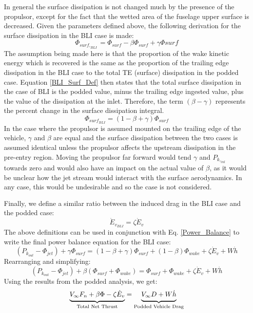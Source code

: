					In general the surface dissipation is not changed much by the presence of the propulsor, except for the fact that the wetted area of the fuselage upper surface is decreased.  Given the parameters defined above, the following derivation for the surface dissipation in the BLI case is made:
					\begin{equation}
						\Phi_{surf,_{BLI}} = \Phi_{surf} - \beta \Phi_{surf} + \gamma \Phi{surf}
						\label{BLI_Surf_Def}
					\end{equation}
					The assumption being made here is that the proportion of the wake kinetic energy which is recovered is the same as the proportion of the trailing edge dissipation in the BLI case to the total TE (surface) dissipation in the podded case.  Equation \ref{BLI_Surf_Def} then states that the total surface dissipation in the case of BLI is the podded value, minus the trailing edge ingested value, plus the value of the dissipation at the inlet.  Therefore, the term $(\beta - \gamma)$ represents the percent change in the surface dissipation integral.
					\begin{equation}
						\Phi_{surf_{BLI}} = (1 - \beta + \gamma)\Phi_{surf}
						\label{gamma_definition}
					\end{equation}
					 In the case where the propulsor is assumed mounted on the trailing edge of the vehicle, $\gamma$ and $\beta$ are equal and the surface dissipation between the two cases is assumed identical unless the propulsor affects the upstream dissipation in the pre-entry region.  Moving the propulsor far forward would tend $\gamma$ and $P_{k,_{inl}}$ towards zero and would also have an impact on the actual value of $\beta$, as it would be unclear how the jet stream would interact with the surface aerodynamics.  In any case, this would be undesirable and so the case is not considered.
					   
					Finally, we define a similar ratio between the induced drag in the BLI case and the podded case:
					\begin{equation}
						\dot{E}_{v_{BLI}} = \zeta \dot{E}_{v}
					\end{equation}
					The above definitions can be used in conjunction with Eq. \ref{Power_Balance} to write the final power balance equation for the BLI case:
					\begin{equation}
						(P_{k_{out}} - \Phi_{jet}) + \gamma \Phi_{surf} = (1 - \beta + \gamma) \Phi_{surf} + (1-\beta) \Phi_{wake} + \zeta \dot{E}_v + W\dot{h}
						\label{BLI_Power_Balance}
					\end{equation}
					Rearranging and simplifying:
					\begin{equation}
						(P_{k_{out}} - \Phi_{jet}) + \beta (\Phi_{surf} + \Phi_{wake}) = \Phi_{surf}+\Phi_{wake} + \zeta \dot{E}_v + W\dot{h}
						\label{BLI_Power_Balance_Simplified}
					\end{equation}
					Using the results from the podded analysis, we get:
					\begin{equation}
						\underbrace{\strut V_\infty F_n  + \beta \Phi - \zeta \dot{E}_v}_{\text{Total Net Thrust}} = \underbrace{\strut V_\infty D + W\dot{h}}_{\text{Podded Vehicle Drag}}
						\label{Podded_Power_Balance_Final}
					\end{equation}
					
